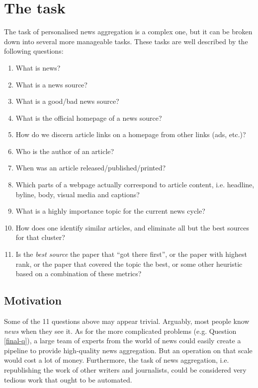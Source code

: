 \section{The task\label{task}}
The task of personalised news aggregation is a complex one, but it can
be broken down into several more manageable tasks.  These tasks are
well described by the following questions:

\begin{enumerate}
    \item What is news?
    \item What is a news source?
    \item What is a good/bad news source?
    \item What is the official homepage of a news source?
    \item How do we discern article links on a homepage from other
          links (ads, etc.)?
    \item Who is the author of an article?
    \item When was an article released/published/printed?
    \item Which parts of a webpage actually correspond to article content,
          i.e. headline, byline, body, visual media and captions?
    \item What is a highly importance topic for the current
          news cycle?
    \item How does one identify similar articles, and eliminate all but the best
          sources for that cluster?
    \item Is the {\it best source} the paper that ``got there first'', or
          the paper with highest rank, or the paper that covered the
          topic the best, or some other heuristic based on a
          combination of these metrics?\label{final-q}
\end{enumerate}
\subsection{Motivation}
Some of the 11 questions above may appear trivial.  Arguably, most
people know {\it news} when they see it.  As for the more
complicated problems (e.g. Question \ref{final-q}), a large team
of experts from the world of news could easily create a
pipeline to provide high-quality news aggregation.
But an operation on that scale would cost a lot of money.
Furthermore, the task of news aggregation, i.e. republishing
the work of other writers and journalists, could be considered
very tedious work that ought to be automated.